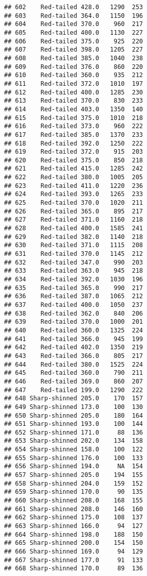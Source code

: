 \documentclass[
]{article}
\begin{document}
\begin{verbatim}
## 602    Red-tailed 428.0   1290  253
## 603    Red-tailed 364.0   1150  196
## 604    Red-tailed 370.0    960  217
## 605    Red-tailed 400.0   1130  227
## 606    Red-tailed 375.0    925  220
## 607    Red-tailed 398.0   1205  227
## 608    Red-tailed 385.0   1040  238
## 609    Red-tailed 376.0    860  220
## 610    Red-tailed 360.0    935  212
## 611    Red-tailed 372.0   1010  197
## 612    Red-tailed 400.0   1285  230
## 613    Red-tailed 370.0    830  233
## 614    Red-tailed 403.0   1350  140
## 615    Red-tailed 375.0   1010  218
## 616    Red-tailed 373.0    960  222
## 617    Red-tailed 385.0   1370  233
## 618    Red-tailed 392.0   1250  222
## 619    Red-tailed 372.0    915  203
## 620    Red-tailed 375.0    850  218
## 621    Red-tailed 415.0   1285  242
## 622    Red-tailed 380.0   1005  205
## 623    Red-tailed 411.0   1220  236
## 624    Red-tailed 393.0   1265  233
## 625    Red-tailed 370.0   1020  211
## 626    Red-tailed 365.0    895  217
## 627    Red-tailed 371.0   1160  218
## 628    Red-tailed 400.0   1585  241
## 629    Red-tailed 382.0   1140  218
## 630    Red-tailed 371.0   1115  208
## 631    Red-tailed 370.0   1145  212
## 632    Red-tailed 347.0    990  203
## 633    Red-tailed 363.0    945  218
## 634    Red-tailed 392.0   1030  196
## 635    Red-tailed 365.0    990  217
## 636    Red-tailed 387.0   1065  212
## 637    Red-tailed 400.0   1050  237
## 638    Red-tailed 362.0    840  206
## 639    Red-tailed 370.0   1000  201
## 640    Red-tailed 360.0   1325  224
## 641    Red-tailed 366.0    945  199
## 642    Red-tailed 402.0   1350  219
## 643    Red-tailed 366.0    805  217
## 644    Red-tailed 380.0   1525  224
## 645    Red-tailed 360.0    790  211
## 646    Red-tailed 369.0    860  207
## 647    Red-tailed 199.0   1290  222
## 648 Sharp-shinned 205.0    170  157
## 649 Sharp-shinned 173.0    100  130
## 650 Sharp-shinned 205.0    180  164
## 651 Sharp-shinned 193.0    100  144
## 652 Sharp-shinned 171.0     88  136
## 653 Sharp-shinned 202.0    134  158
## 654 Sharp-shinned 158.0    100  122
## 655 Sharp-shinned 176.0    100  133
## 656 Sharp-shinned 194.0     NA  154
## 657 Sharp-shinned 205.0    194  155
## 658 Sharp-shinned 204.0    159  152
## 659 Sharp-shinned 170.0     90  135
## 660 Sharp-shinned 208.0    168  155
## 661 Sharp-shinned 208.0    146  160
## 662 Sharp-shinned 175.0    108  137
## 663 Sharp-shinned 166.0     94  127
## 664 Sharp-shinned 198.0    188  150
## 665 Sharp-shinned 200.0    154  150
## 666 Sharp-shinned 169.0     94  129
## 667 Sharp-shinned 177.0     91  133
## 668 Sharp-shinned 170.0     89  136

\end{verbatim}
\end{document}
